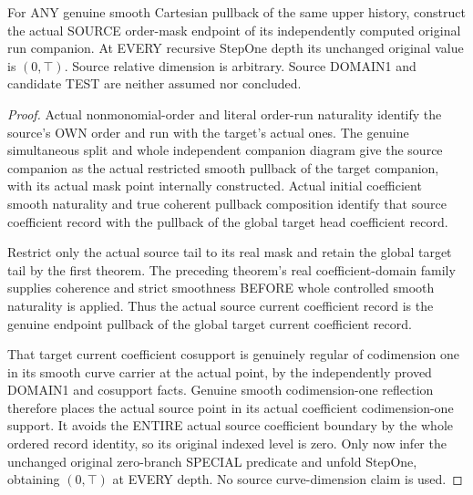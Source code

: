 \begin{theorem}
\label{hir:original-untested-curve-smooth-run-companion-special-value}
\leanok
For ANY genuine smooth Cartesian pullback of the same upper history,
construct the actual SOURCE order-mask endpoint of its independently
computed original run companion. At EVERY recursive StepOne depth its
unchanged original value is $(0,\top)$. Source relative dimension is
arbitrary. Source DOMAIN1 and candidate TEST are neither assumed nor
concluded.
\end{theorem}
\begin{proof}
Actual nonmonomial-order and literal order-run naturality identify the
source's OWN order and run with the target's actual ones. The genuine
simultaneous split and whole independent companion diagram give the
source companion as the actual restricted smooth pullback of the
target companion, with its actual mask point internally constructed.
Actual initial coefficient smooth naturality and true coherent
pullback composition identify that source coefficient record with
the pullback of the global target head coefficient record.

Restrict only the actual source tail to its real mask and retain the
global target tail by the first theorem. The preceding theorem's real
coefficient-domain family supplies coherence and strict smoothness
BEFORE whole controlled smooth naturality is applied. Thus the actual
source current coefficient record is the genuine endpoint pullback of
the global target current coefficient record.

That target current coefficient cosupport is genuinely regular of
codimension one in its smooth curve carrier at the actual point, by
the independently proved DOMAIN1 and cosupport facts. Genuine smooth
codimension-one reflection therefore places the actual source point
in its actual coefficient codimension-one support. It avoids the
ENTIRE actual source coefficient boundary by the whole ordered record
identity, so its original indexed level is zero. Only now infer the
unchanged original zero-branch SPECIAL predicate and unfold StepOne,
obtaining $(0,\top)$ at EVERY depth. No source curve-dimension claim
is used.
\end{proof}

